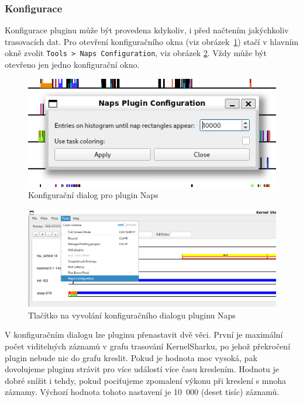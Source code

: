 \subsubsection{Konfigurace}

Konfigurace pluginu může být provedena kdykoliv, i před načtením jakýchkoliv trasovacích dat. Pro otevření konfiguračního okna (viz obrázek~\ref{naps-cfg-window}) stačí v hlavním okně zvolit \texttt{Tools > Naps Configuration}, viz obrázek \ref{naps-cfg-btn}. Vždy může být otevřeno jen jedno konfigurační okno.

\begin{figure}[p]\centering
    \includegraphics[width=140mm]{img/Naps/NapsConfigWindow}
    \caption{Konfigurační dialog pro plugin Naps}
    \label{naps-cfg-window}
\end{figure}

\begin{figure}[p]\centering
    \includegraphics[width=140mm]{img/Naps/NapsConfigButton}
    \caption{Tlačítko na vyvolání konfiguračního dialogu pluginu Naps}
    \label{naps-cfg-btn}
\end{figure}

V konfiguračním dialogu lze pluginu přenastavit dvě věci. První je maximální počet viditelných záznamů v grafu trasování KernelSharku, po jehož překročení plugin nebude nic do grafu kreslit. Pokud je hodnota moc vysoká, pak dovolujeme pluginu strávit pro více událostí více času kreslením. Hodnotu je dobré snížit i tehdy, pokud pociťujeme zpomalení výkonu při kreslení s mnoha záznamy. Výchozí hodnota tohoto nastavení je 10~000 (deset tisíc) záznamů.


